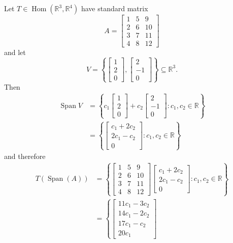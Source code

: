\documentclass[12pt,letterpaper,reqno]{article}
\numberwithin{equation}{section}
\newcommand{\R}{\ensuremath{\mathbb R}}
\DeclareMathOperator{\Hom}{Hom}
\DeclareMathOperator{\Span}{Span}
\begin{document}
\begin{example}
Let $T \in \Hom(\R^3,\R^4)$ have standard matrix $$A=\begin{bmatrix}
	1 & 5 & 9 \\
	2 & 6 & 10 \\
	3 & 7 & 11 \\
	4 & 8 & 12
\end{bmatrix}$$ and let $$V=\left\{\begin{bmatrix}
	1 \\ 2 \\ 0
\end{bmatrix}, \begin{bmatrix}
	2 \\ -1 \\ 0
\end{bmatrix}
\right\} \subseteq \R^3.$$ Then
\begin{align*}
	\Span V&=\left\{c_1\begin{bmatrix}
	1 \\ 2 \\ 0
\end{bmatrix}+c_2\begin{bmatrix}
	2 \\ -1 \\ 0
\end{bmatrix}:c_1,c_2 \in \R\right\} \\
&=\left\{\begin{bmatrix}
	c_1+2c_2 \\ 2c_1-c_2 \\ 0
\end{bmatrix}:c_1,c_2 \in \R\right\}
\end{align*}	
and therefore
\begin{align*}
	T(\Span(A))&=\left\{\begin{bmatrix}
	1 & 5 & 9 \\
	2 & 6 & 10 \\
	3 & 7 & 11 \\
	4 & 8 & 12
\end{bmatrix}\begin{bmatrix}
	c_1+2c_2 \\ 2c_1-c_2 \\ 0
\end{bmatrix}:c_1,c_2 \in \R\right\} \\
&=\left\{\begin{bmatrix}
	11c_1-3c_2 \\ 14c_1-2c_2 \\ 17c_1-c_2 \\ 20c_1

\end{bmatrix}
\end{align*}
\end{example}
\end{document}
